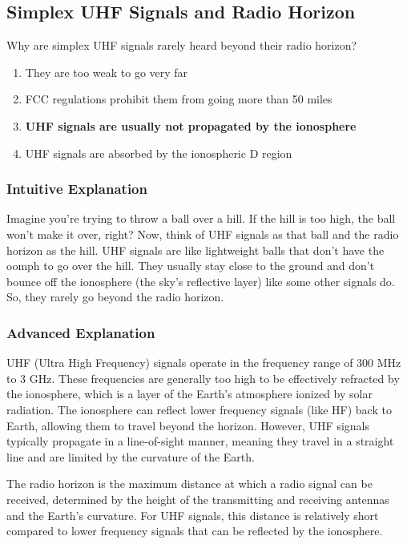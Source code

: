 \subsection{Simplex UHF Signals and Radio Horizon}
\label{T3C01}

\begin{tcolorbox}[colback=gray!10!white,colframe=black!75!black,title=T3C01]
Why are simplex UHF signals rarely heard beyond their radio horizon?
\begin{enumerate}[label=\Alph*)]
    \item They are too weak to go very far
    \item FCC regulations prohibit them from going more than 50 miles
    \item \textbf{UHF signals are usually not propagated by the ionosphere}
    \item UHF signals are absorbed by the ionospheric D region
\end{enumerate}
\end{tcolorbox}

\subsubsection{Intuitive Explanation}
Imagine you're trying to throw a ball over a hill. If the hill is too high, the ball won't make it over, right? Now, think of UHF signals as that ball and the radio horizon as the hill. UHF signals are like lightweight balls that don't have the oomph to go over the hill. They usually stay close to the ground and don't bounce off the ionosphere (the sky's reflective layer) like some other signals do. So, they rarely go beyond the radio horizon.

\subsubsection{Advanced Explanation}
UHF (Ultra High Frequency) signals operate in the frequency range of 300 MHz to 3 GHz. These frequencies are generally too high to be effectively refracted by the ionosphere, which is a layer of the Earth's atmosphere ionized by solar radiation. The ionosphere can reflect lower frequency signals (like HF) back to Earth, allowing them to travel beyond the horizon. However, UHF signals typically propagate in a line-of-sight manner, meaning they travel in a straight line and are limited by the curvature of the Earth. 

The radio horizon is the maximum distance at which a radio signal can be received, determined by the height of the transmitting and receiving antennas and the Earth's curvature. For UHF signals, this distance is relatively short compared to lower frequency signals that can be reflected by the ionosphere. 

